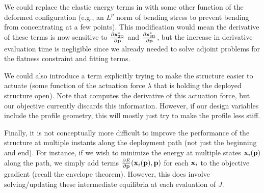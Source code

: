 \documentclass[10pt]{article}
\providecommand{\pder}[2]{\frac{\partial #1}{\partial #2}}
\renewcommand{\vec}[1]{{\bf #1}}
\newcommand\pr[1]{\prettyref{#1}}
\def\x{\vec{x}}
\def\p{\vec{p}}
\def\xflat{\vec{x}^*_\text{2D}}
\def\xdeploy{\vec{x}^*_\text{3D}}
\begin{document}
We could replace the elastic energy terms in \pr{eqn:J} with some other
function of the deformed configuration (e.g., an $L^p$ norm of bending stress to
prevent bending from concentrating at a few points). This modification would mean
the derivative of these terms is now sensitive to $\pder{\xflat}{\p}$ and $\pder{\xdeploy}{\p}$,
but the increase in derivative evaluation time is negligible since we already needed to solve adjoint
problems for the flatness constraint and fitting terms.

We could also introduce a term explicitly trying to make the structure easier
to actuate (some function of the actuation force $\lambda$ that is holding the
deployed structure open). Note that \pr{eqn:deploy_sensitivity} computes the
derivative of this actuation force, but our objective currently discards this
information. However, if our design variables include the profile geometry,
this will mostly just try to make the profile less stiff.

Finally, it is not conceptually more difficult to improve the performance of the structure
at multiple instants along the deployment path (not just the beginning and end). For instance,
if we wish to minimize the energy at multiple states $\x_i(\p)$ along the path, we simply add terms
$\pder{E}{\p}(\x_i(\p), \p)$ for each $\x_i$ to the objective gradient (recall the envelope theorem).
However, this does involve solving/updating these intermediate equilibria at each evaluation of $J$.
\end{document}
